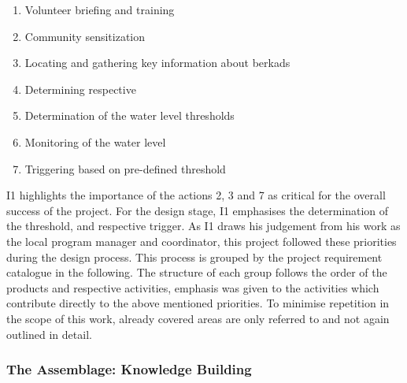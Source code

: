 \begin{enumerate}
    \item Volunteer briefing and training
    \item Community sensitization
    \item Locating and gathering key information about berkads
    \item Determining respective 
    \item Determination of the water level thresholds 
    \item Monitoring of the water level
    \item Triggering  based on pre-defined threshold 
\end{enumerate}

I1 highlights the importance of the actions 2, 3 and 7 as critical for the overall success of the project. For the design stage, I1 emphasises the determination of the threshold,  and respective trigger. As I1 draws his judgement from his work as the local program manager and coordinator, this project followed these priorities during the design process. This process is grouped by the project requirement catalogue in the following. The structure of each group follows the order of the products and respective activities, emphasis was given to the activities which contribute directly to the above mentioned priorities. To minimise repetition in the scope of this work, already covered areas are only referred to and not again outlined in detail. 

\subsubsection{The Assemblage: Knowledge Building}\label{subsubsec:assemblage}

